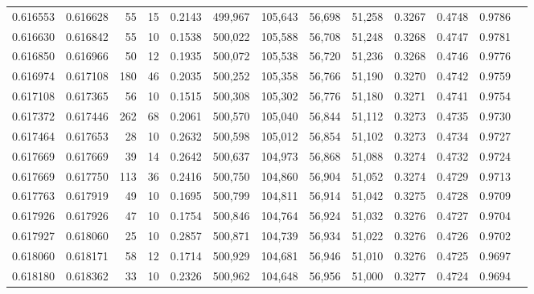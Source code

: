 \begin{tabular}{rrrrrrrrrrrrr}
0.616553 & 0.616628 &    55 &  15 &                                     0.2143 & 499,967 & 105,643 &  56,698 &  51,258 & 0.3267 & 0.4748 & 0.9786 \\
0.616630 & 0.616842 &    55 &  10 &                                     0.1538 & 500,022 & 105,588 &  56,708 &  51,248 & 0.3268 & 0.4747 & 0.9781 \\
0.616850 & 0.616966 &    50 &  12 &                                     0.1935 & 500,072 & 105,538 &  56,720 &  51,236 & 0.3268 & 0.4746 & 0.9776 \\
0.616974 & 0.617108 &   180 &  46 &                                     0.2035 & 500,252 & 105,358 &  56,766 &  51,190 & 0.3270 & 0.4742 & 0.9759 \\
0.617108 & 0.617365 &    56 &  10 &                                     0.1515 & 500,308 & 105,302 &  56,776 &  51,180 & 0.3271 & 0.4741 & 0.9754 \\
0.617372 & 0.617446 &   262 &  68 &                                     0.2061 & 500,570 & 105,040 &  56,844 &  51,112 & 0.3273 & 0.4735 & 0.9730 \\
0.617464 & 0.617653 &    28 &  10 &                                     0.2632 & 500,598 & 105,012 &  56,854 &  51,102 & 0.3273 & 0.4734 & 0.9727 \\
0.617669 & 0.617669 &    39 &  14 &                                     0.2642 & 500,637 & 104,973 &  56,868 &  51,088 & 0.3274 & 0.4732 & 0.9724 \\
0.617669 & 0.617750 &   113 &  36 &                                     0.2416 & 500,750 & 104,860 &  56,904 &  51,052 & 0.3274 & 0.4729 & 0.9713 \\
0.617763 & 0.617919 &    49 &  10 &                                     0.1695 & 500,799 & 104,811 &  56,914 &  51,042 & 0.3275 & 0.4728 & 0.9709 \\
0.617926 & 0.617926 &    47 &  10 &                                     0.1754 & 500,846 & 104,764 &  56,924 &  51,032 & 0.3276 & 0.4727 & 0.9704 \\
0.617927 & 0.618060 &    25 &  10 &                                     0.2857 & 500,871 & 104,739 &  56,934 &  51,022 & 0.3276 & 0.4726 & 0.9702 \\
0.618060 & 0.618171 &    58 &  12 &                                     0.1714 & 500,929 & 104,681 &  56,946 &  51,010 & 0.3276 & 0.4725 & 0.9697 \\
0.618180 & 0.618362 &    33 &  10 &                                     0.2326 & 500,962 & 104,648 &  56,956 &  51,000 & 0.3277 & 0.4724 & 0.9694 \\

\end{tabular}
